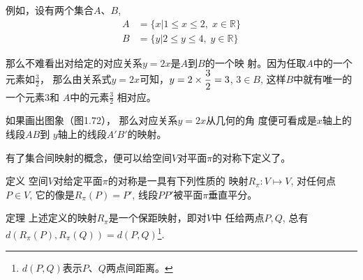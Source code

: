 例如，设有两个集合$A$、$B$, 
\[\begin{split}
  A&=\{x|1\le x\le 2,\; x\in\mathbb{R}\}\\
B&=\{y|2\le y\le 4,\; y\in\mathbb{R}\}
\end{split}\]

那么不难看出对给定的对应关系$y=2x$是$A$到$B$的一个映
射。因为任取$A$中的一个元素如$\frac{3}{2}$，
那么由关系式$y=2x$可知，$y=2\times\dfrac{3}{2}=3$, $3\in B$, 这样$B$中就有唯一的一个元素3和
$A$中的元素$\frac{3}{2}$
相对应。

\begin{figure}[htp]
  \centering
{}
  \caption{}
\end{figure}

如果画出图象（图1.72），
那么对应关系$y=2x$从几何的角
度便可看成是$x$轴上的线段$AB$到
$y$轴上的线段$A'B'$的映射。

有了集合间映射的概念，便可以给空间$V$对平面$\pi$的对称下定义了。

\begin{blk}
  {定义} 空间$V$对给定平面$\pi$的对称是一具有下列性质的
映射$R_{\pi}:V\mapsto V$, 对任何点$P\in V$, 它的像是$R_{\pi}(P)=P'$, 
线段$PP'$被平面$\pi$垂直平分。
\end{blk}

\begin{blk}
  {定理} 上述定义的映射$R_{\pi}$是一个保距映射，即对$V$中
任给两点$P,Q$, 总有$d(R_{\pi}(P),R_{\pi}(Q))=d(P,Q)$\footnote{$d(P,Q)$表示$P$、$Q$两点间距离。}.
\end{blk}

